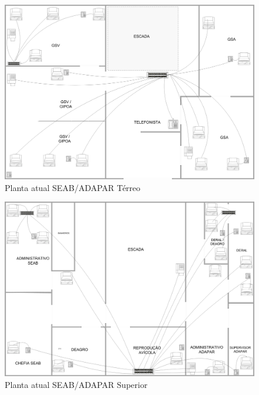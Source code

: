 \documentclass[	DIV=calc,%
							paper=a4,%
							fontsize=12pt,%
							onecolumn]{scrartcl}	 					%
\begin{document}
\begin{figure}[H]
	\centering
	\includegraphics[height=\textwidth,width=25cm,angle=-90,keepaspectratio]{plantaseabterreo}
	\caption{Planta atual SEAB/ADAPAR  Térreo}
	\label{SEAB/ADAPAR ATUAL}	
\end{figure}
\begin{figure}[H]
	\centering
	\includegraphics[height=\textwidth,width=25cm,angle=-90,keepaspectratio]{plantaseab1andar}
	\caption{Planta atual SEAB/ADAPAR Superior}
	\label{SEAB/ADAPAR ATUAL 1}	
\end{figure}
\end{document}
